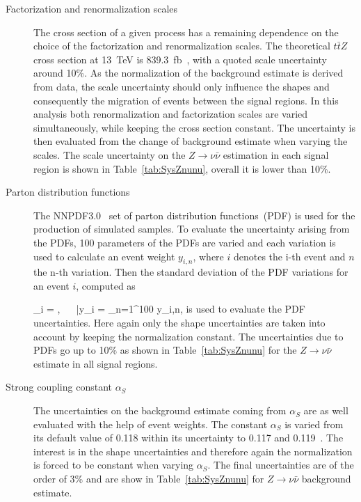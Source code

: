 \begin{description}
\item[Factorization and renormalization scales]
The cross section of a given process has a remaining dependence on the choice of the factorization and renormalization scales. The theoretical $t\bar{t}Z$ cross section at 13~TeV is 839.3~fb~\cite{deFlorian:2016spz}, with a quoted scale uncertainty around 10\%. As the normalization of the background estimate is derived from data, the scale uncertainty should only influence the shapes and consequently the migration of events between the signal regions. In this analysis both renormalization and factorization scales are varied simultaneously, while keeping the cross section constant. The uncertainty is then evaluated from the change of background estimate when varying the scales. The scale uncertainty on the $Z \to \nu \bar{\nu}$ estimation in each signal region is shown in Table~\ref{tab:SysZnunu}, overall it is lower than 10\%.


\item[Parton distribution functions]
The NNPDF3.0~\cite{Ball:2014uwa} set of parton distribution functions~(PDF) is used for the production of simulated samples. To evaluate the uncertainty arising from the PDFs, 100 parameters of the PDFs are varied and each variation is used to calculate an event weight $y_{i,n}$, where $i$ denotes the i-th event and $n$ the n-th variation. Then the standard deviation of the PDF variations for an event $i$, computed as

{
\sigma_{i} = , ~~ \bar{y}_{i} =  \sum_{n=1}^{100} y_{i,n},
}
is used to evaluate the PDF uncertainties. Here again only the shape uncertainties are taken into account by keeping the normalization constant. The uncertainties due to PDFs go up to 10\% as shown in Table~\ref{tab:SysZnunu} for the $Z \to \nu \bar{\nu}$ estimate in all signal regions.

\item[Strong coupling constant $\alpha_{S}$]
The uncertainties on the background estimate coming from $\alpha_{S}$ are as well evaluated with the help of event weights. The constant $\alpha_{S}$ is varied from its default value of 0.118  within its uncertainty to 0.117 and 0.119~\cite{Patrignani:2016xqp}.  The interest is in the shape uncertainties and therefore again the normalization is forced to be constant when varying $\alpha_{S}$. The final uncertainties are of the order of 3\% and are show in Table~\ref{tab:SysZnunu} for $Z \to \nu \bar{\nu}$ background estimate.
\end{description}

